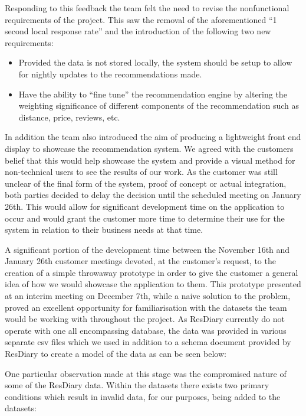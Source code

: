 \documentclass{l3proj}
\begin{document}
Responding to this feedback the team felt the need to revise the nonfunctional requirements of the project. This saw the removal of the aforementioned “1 second local response 
rate” and the introduction of the following two new requirements:

\begin{itemize}
\item Provided the data is not stored locally, the system should be setup to allow for nightly updates to the recommendations made.
\item Have the ability to “fine tune” the recommendation engine by altering the weighting significance of different components of the recommendation such as distance, price, 
reviews, etc.
\end{itemize}

In addition the team also introduced the aim of producing a lightweight front end display to showcase the recommendation system. We agreed with the customers belief that this would help showcase the system and provide a visual method for non-technical users to see the results of our work. As the customer was still unclear of the final form of the system, proof of concept or actual integration, both parties decided to delay the decision until the scheduled meeting on January 26th. This would allow for significant development time on the application to occur and would grant the customer more time to determine their use for the system in relation to their business needs at that time.

A significant portion of the development time between the November 16th and January 26th customer meetings devoted, at the customer’s request, to the creation of a simple throwaway prototype in order to give the customer a general idea of how we would showcase the application to them. This prototype presented at an interim meeting on December 7th, while a naive solution to the problem, proved an excellent opportunity for familiarisation with the datasets the team would be working with throughout the project. As ResDiary currently do not operate with one all encompassing database, the data was provided in various separate csv files which we used in addition to a schema document provided by ResDiary to create a model of the data as can be seen below:

One particular observation made at this stage was the compromised nature of some of the ResDiary data. Within the datasets there exists two primary conditions which result in invalid data, for our purposes, being added to the datasets:
\end{document}
